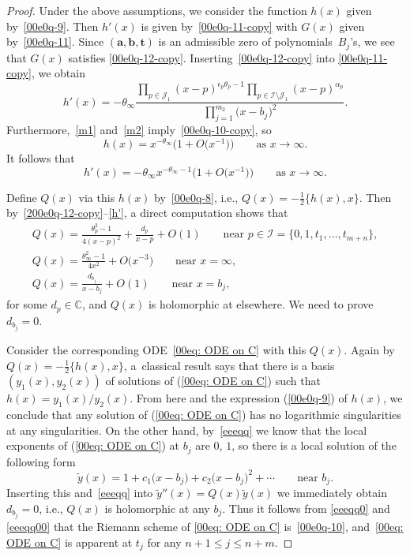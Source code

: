 \documentclass[10pt,a4paper]{amsart}
\numberwithin{equation}{section}
\begin{document}
\begin{proof} Under the above assumptions, we consider the function $h(x)$ given by~\eqref{00e0q-9}. Then $h'(x)$ is given by~\eqref{00e0q-11-copy} with $G(x)$ given by~\eqref{00e0q-11}.
Since $(\boldsymbol a,\boldsymbol b,\boldsymbol t)$ is an admissible
zero of polynomials~$B_j$'s, we see that $G(x)$ satisfies
\eqref{00e0q-12-copy}. Inserting~\eqref{00e0q-12-copy} into
\eqref{00e0q-11-copy}, we obtain
\begin{equation}\label{200e0q-12-copy}h'(x)=-\theta_\infty \frac{ \prod_{p\in \mathcal{J}_1}(x-p)^{\epsilon_{p}\theta_{p}-1}\prod_{p\in \mathcal{I}\setminus\mathcal{J}_1}(x-p)^{{\alpha}_{p}}}{\prod_{j=1}^{m_2}\bigl(x-b_j\bigr)^2}.\end{equation}
Furthermore,~\eqref{m1} and~\eqref{m2} imply~\eqref{00e0q-10-copy}, so
\begin{equation}\label{h}
 h(x)=x^{-\theta_\infty}\bigl(1+O\bigl(x^{-1}\bigr)\bigr)\qquad \text{as }x\to\infty.
\end{equation}
It follows that
\begin{equation}\label{h'}h'(x)=-\theta_\infty x^{-\theta_\infty-1}\bigl(1+O\bigl(x^{-1}\bigr)\bigr)\qquad \text{as }x\to\infty.\end{equation}

Define $Q(x)$ via this $h(x)$ by~\eqref{00e0q-8}, i.e., $Q(x)=-\frac12\{h(x),x\}$.
Then by~\eqref{200e0q-12-copy}--\eqref{h'}, a direct computation shows
that
\begin{gather}
\label{eeeqq0}Q(x)=\frac{\theta_p^2-1}{4(x-p)^2}+\frac{d_p}{x-p}+O(1)\qquad \text{near }p\in \mathcal{I}=\{0,1,t_1,\dots,t_{m+n}\},\\
\label{eeeqq00}Q(x)=\frac{\theta_\infty^2-1}{4x^2}+O\bigl(x^{-3}\bigr)\qquad \text{near }x=\infty,\\
\label{eeeqq}Q(x)=\frac{d_{b_j}}{x-b_j}+O(1)\qquad \text{near }x=b_j,
\end{gather}
for some $d_p\in\mathbb{C}$, and $Q(x)$ is holomorphic at elsewhere. We need to prove $d_{b_j}=0$.

Consider the corresponding ODE~\eqref{00eq: ODE on C} with this $Q(x)$. Again by $Q(x)=-\frac12\{h(x),x\}$, a~classical result says that there is a basis $(y_1(x),y_2(x))$ of solutions of (\ref{00eq: ODE on C}) such that $h(x)=y_1(x)/y_2(x)$. From here and the expression (\ref{00e0q-9}) of $h(x)$, we conclude that any solution of (\ref{00eq: ODE on C}) has no logarithmic singularities at any singularities.
On the other hand, by~\eqref{eeeqq} we know that the local exponents of (\ref{00eq: ODE on C}) at $b_j$ are $0$, $1$, so there is a local solution of the following form
\[\tilde{y}(x)=1+c_1\bigl(x-b_j\bigr)+c_2\bigl(x-b_j\bigr)^2+\cdots \qquad\text{near }b_j.\]
Inserting this and~\eqref{eeeqq} into
$\tilde{y}''(x)=Q(x)\tilde{y}(x)$ we immediately obtain $d_{b_j}=0$,
i.e., $Q(x)$ is holomorphic at any $b_j$. Thus it follows from
\eqref{eeeqq0} and \eqref{eeeqq00} that the Riemann scheme of
\eqref{00eq: ODE on C} is~\eqref{00e0q-10}, and~\eqref{00eq: ODE on C}
is apparent at $t_j$ for any $n+1\leq j\leq n+m$.


\end{proof}
\end{document}
